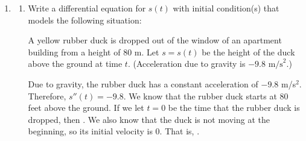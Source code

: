 \documentclass[main]{subfiles}
\begin{document}
\begin{enumerate}
\pspace{\newpage}


\item  \label{second-order}



  \begin{enumerate}
    \item
    \begin{problem}[1.5in]
    Write a differential equation for $s(t)$ with initial condition(s) that models 
    the following situation:

    A yellow rubber duck is dropped out of the window of an apartment
    building from a height of 80 m.  Let $s = s(t)$ be the height of the
    duck above the ground at time $t$.  (Acceleration due to gravity is 
    $-9.8 \textrm{ m/s}^2$.)  

  \end{problem}

  \begin{solution}
    Due to gravity, the rubber duck has a constant acceleration of $-9.8$   
    m/s$^2$.  Therefore, $\boxed{s''(t) = -9.8}$.  We know that the rubber
    duck starts at 80 feet above the ground.  If we let $t = 0$ be the
    time that the rubber duck is dropped, then .  We
    also know that the duck is not moving at the beginning, so its initial
    velocity is 0.  That is, .
  \end{solution}
    

\end{enumerate}
\end{enumerate}
\end{document}
